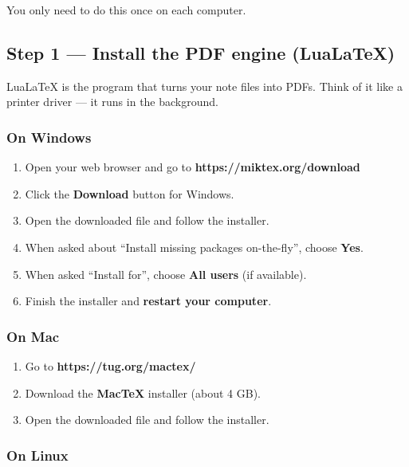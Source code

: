 \documentclass[a4paper,11pt]{article}
\begin{document}
You only need to do this once on each computer.

\subsection{Step 1 --- Install the PDF engine (LuaLaTeX)}

LuaLaTeX is the program that turns your note files into PDFs. Think of it like a printer driver --- it runs in the background.

\subsubsection{On Windows}

\begin{stepbox}
\begin{enumerate}[itemsep=6pt]
  \item Open your web browser and go to \textbf{https://miktex.org/download}
  \item Click the \textbf{Download} button for Windows.
  \item Open the downloaded file and follow the installer.
  \item When asked about ``Install missing packages on-the-fly'', choose \textbf{Yes}.
  \item When asked ``Install for'', choose \textbf{All users} (if available).
  \item Finish the installer and \textbf{restart your computer}.
\end{enumerate}
\end{stepbox}

\subsubsection{On Mac}

\begin{stepbox}
\begin{enumerate}[itemsep=6pt]
  \item Go to \textbf{https://tug.org/mactex/}
  \item Download the \textbf{MacTeX} installer (about 4 GB).
  \item Open the downloaded file and follow the installer.
\end{enumerate}
\end{stepbox}

\subsubsection{On Linux}
\end{document}
